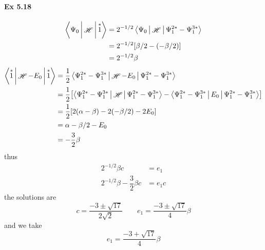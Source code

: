 \documentclass[a4paper]{article}
\DeclareMathOperator{\sH}{\mathscr{H}}
\newcommand{\ex}[1]{\paragraph{Ex #1}}
\numberwithin{equation}{subsection}
\begin{document}
\ex{5.18}
\begin{align}
\Braket{\Psi_0 | \sH | \overset{*}{1}} &= 2^{-1/2} \Braket{\Psi_0 | \sH | \Psi_1^{2*} - \Psi_1^{3*}} \notag\\
&= 2^{-1/2}[\beta/2 - (-\beta/2)] \notag\\
&= 2^{-1/2}\beta
\end{align}
\begin{align}
\Braket{ \overset{*}{1} | \sH - E_0 | \overset{*}{1}} &= \dfrac{1}{2} \Braket{\Psi_1^{2*} - \Psi_1^{3*} | \sH - E_0 | \Psi_1^{2*} - \Psi_1^{3*}}
\notag\\
&= \dfrac{1}{2} \qty[
\Braket{\Psi_1^{2*} - \Psi_1^{3*} | \sH | \Psi_1^{2*} - \Psi_1^{3*}} 
- \Braket{\Psi_1^{2*} - \Psi_1^{3*} | E_0 | \Psi_1^{2*} - \Psi_1^{3*}}
] \notag\\
&= \dfrac{1}{2} \qty[ 2(\alpha-\beta) - 2(-\beta/2) - 2E_0] \notag\\
&= \alpha - \beta/2 - E_0 \notag\\
&= -\dfrac{3}{2}\beta
\end{align}
thus
\begin{align}
2^{-1/2}\beta c &= e_1 \\
2^{-1/2}\beta -\dfrac{3}{2}\beta c &= e_1 c
\end{align}
the solutions are
\begin{equation}\label{key}
c = \dfrac{-3 \pm \sqrt{17}}{2\sqrt{2}} \qquad 
e_1 = \dfrac{-3 \pm\sqrt{17}}{4}\beta
\end{equation}
and we take
\begin{equation}\label{key}
e_1 = \dfrac{-3 + \sqrt{17}}{4}\beta
\end{equation}
\end{document}
